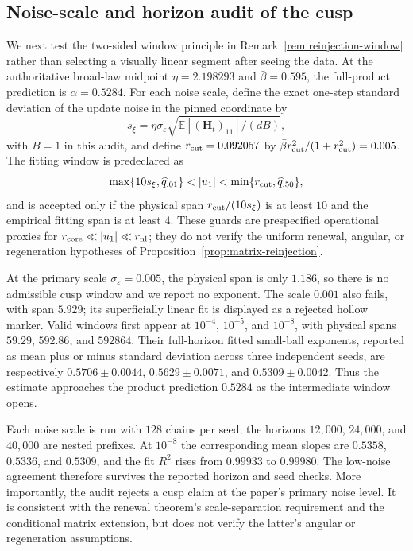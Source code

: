 \documentclass[11pt]{article}
\theoremstyle{definition}
\newcommand{\E}{\mathbb E}
\newcommand{\Hvec}{\mathbf H}
\begin{document}
\subsection{Noise-scale and horizon audit of the cusp}
\label{sec:cusp-audit}

We next test the two-sided window principle in
Remark~\ref{rem:reinjection-window} rather than selecting a visually linear
segment after seeing the data.  At the authoritative broad-law
midpoint $\eta=2.198293$ and $\bar\beta=0.595$, the full-product prediction is
$\alpha=0.5284$.  For each noise scale, define the exact one-step standard
deviation of the update noise in the pinned coordinate by
\begin{equation}
 s_\xi=\eta\sigma_\varepsilon
 \sqrt{\E[(\Hvec_t)_{11}]/(dB)},
 \label{eq:cusp-innovation-scale}
\end{equation}
with $B=1$ in this audit, and define $r_{\rm cut}=0.092057$ by
$\bar\beta r_{\rm cut}^2/(1+r_{\rm cut}^2)=0.005$.  The fitting window is
predeclared as
\begin{equation}
 \max\{10s_\xi,\widehat q_{.01}\}<|u_1|
 <\min\{r_{\rm cut},\widehat q_{.50}\},
 \label{eq:cusp-fit-window}
\end{equation}
and is accepted only if the physical span
$r_{\rm cut}/(10s_\xi)$ is at least $10$ and the empirical fitting span is at
least $4$.  These guards are prespecified operational proxies for
$r_{\rm core}\ll|u_1|\ll r_{\rm nl}$; they do not verify the uniform renewal,
angular, or regeneration hypotheses of
Proposition~\ref{prop:matrix-reinjection}.

At the primary scale $\sigma_\varepsilon=0.005$, the physical span is only
$1.186$, so there is no admissible cusp window and we report no exponent.
The scale $0.001$ also fails, with span $5.929$; its superficially linear fit
is displayed as a rejected hollow marker.  Valid windows first appear at
$10^{-4}$, $10^{-5}$, and $10^{-8}$, with physical spans $59.29$, $592.86$,
and $592864$.  Their full-horizon fitted small-ball exponents, reported as
mean plus or minus standard deviation across three independent seeds, are respectively
$0.5706\pm0.0044$, $0.5629\pm0.0071$, and
$0.5309\pm0.0042$.  Thus the estimate approaches the product prediction
$0.5284$ as the intermediate window opens.

Each noise scale is run with $128$ chains per seed; the horizons
$12{,}000$, $24{,}000$, and $40{,}000$ are nested prefixes.  At $10^{-8}$ the corresponding
mean slopes are $0.5358$, $0.5336$, and $0.5309$, and the fit $R^2$ rises
from $0.99933$ to $0.99980$.  The low-noise agreement therefore survives the
reported horizon and seed checks.  More importantly, the audit rejects a
cusp claim at the paper's primary noise level.  It is consistent with the
renewal theorem's scale-separation requirement and the conditional matrix
extension, but does not verify the latter's angular or regeneration
assumptions.
\end{document}
